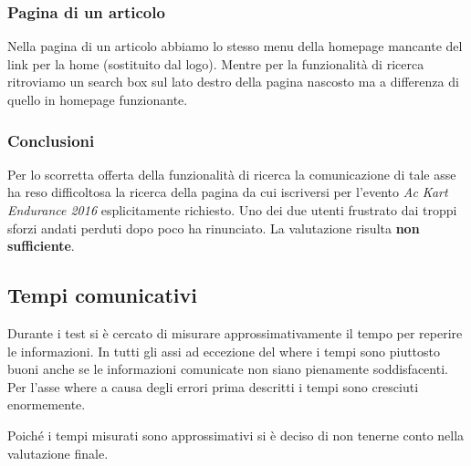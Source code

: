 		\subsubsection{Pagina di un articolo}
			Nella pagina di un articolo abbiamo lo stesso menu della homepage mancante del link per la home (sostituito dal logo). Mentre per la funzionalità di ricerca ritroviamo un search box sul lato destro della pagina nascosto ma a differenza di quello in homepage funzionante.
			
		\subsubsection{Conclusioni}
			Per lo scorretta offerta della funzionalità di ricerca la comunicazione di tale asse ha reso difficoltosa la ricerca della pagina da cui iscriversi per l'evento \textit{Ac Kart Endurance 2016} esplicitamente richiesto. Uno dei due utenti frustrato dai troppi sforzi andati perduti dopo poco ha rinunciato. La valutazione risulta \textbf{non sufficiente}.
			
			
	\subsection{Tempi comunicativi}
		Durante i test si è cercato di misurare approssimativamente il tempo per reperire le informazioni. In tutti gli assi ad eccezione del where i tempi sono piuttosto buoni anche se le informazioni comunicate non siano pienamente soddisfacenti. Per l'asse where a causa degli errori prima descritti i tempi sono cresciuti enormemente.
		
		Poiché i tempi misurati sono approssimativi si è deciso di non tenerne conto nella valutazione finale.